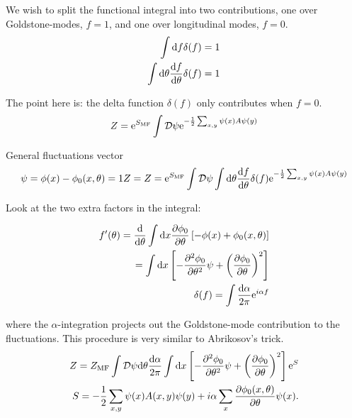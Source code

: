 We wish to split the functional integral into two contributions, one over Goldstone-modes, $f = 1$, and one over longitudinal modes, $f = 0$. \\ 

\begin{align*}
    \int \dd f \delta (f) = 1 \\ 
    \int \dd \theta \dv{f}{\theta} \delta(f) = 1 \\
\end{align*}

The point here is: the delta function $\delta (f)$ only contributes when $f = 0$. \\ 

\begin{align*}
    Z = \mathrm{e}^{S_{\text{MF}}}\int \mathcal{D} \psi \mathrm{e}^{-\frac{1}{2}\sum_{x,y} \psi(x) A \psi(y)}
\end{align*}

General fluctuations vector \\ 

\begin{align*}
    \psi = \phi(x) - \phi_{0}(x,\theta) = 1
    Z = Z = \mathrm{e}^{S_{\text{MF}}}\int \mathcal{D} \psi \int \dd \theta \dv{f}{\theta} \delta(f) \mathrm{e}^{-\frac{1}{2}\sum_{x,y} \psi(x) A \psi(y)}
\end{align*}

Look at the two extra factors in the integral: 

\begin{align*}
    f'(\theta) = \dv{}{\theta} \int \dd x \pdv{\phi_0}{\theta}\left[-\phi(x) + \phi_0(x,\theta) \right] \\
    = \int \dd x \left[ -\pdv{^2\phi_0}{\theta^2} \psi + \left(\pdv{\phi_0}{\theta}\right)^2 \right] \\ 
    \delta(f) = \int \frac{\dd \alpha}{2\pi}\mathrm{e}^{i\alpha f}
\end{align*}

where the $\alpha$-integration projects out the Goldstone-mode contribution to the fluctuations. This procedure is very similar to Abrikosov's trick. \\ 

\begin{align*}
    Z = Z_{\text{MF}} \int \mathcal{D} \psi \dd \theta \frac{\dd \alpha}{2\pi} \int \dd x \left[ -\pdv{^2\phi_0}{\theta^2} \psi + \left(\pdv{\phi_0}{\theta}\right)^2 \right] \mathrm{e}^{S} \\ 
    S = -\frac{1}{2}\sum_{x,y} \psi(x) A(x,y) \psi(y) + i\alpha \sum_x \pdv{\phi_0(x,\theta)}{\theta}\psi(x). 
\end{align*}

